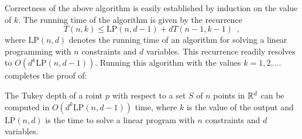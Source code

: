 \documentclass[charterfonts,lotsofwhite]{patmorin}
\newcommand{\lp}{\mathrm{LP}}
\begin{document}
Correctness of the above algorithm is easily established by induction
on the value of $k$.  The running time of the algorithm is given by
the recurrence
\[
    T(n,k) \le \lp(n,d-1)+ dT(n-1,k-1) \enspace ,
\]
where $\lp(n,d)$ denotes the running time of an algorithm for solving
a linear programming with $n$ constraints and $d$ variables.  This
recurrence readily resolves to $O(d^k\lp(n,d-1))$.  Running this
algorithm with the values $k=1,2,\ldots$ completes the
proof of:

\begin{thm}
The Tukey depth of a roint $p$ with respect to a set $S$ of $n$ points
in $\mathbb{R}^d$ can be computed in $O(d^k\lp(n,d-1))$ time, where $k$ is
the value of the output and $\lp(n,d)$ is the time to solve a linear
program with $n$ constraints and $d$ variables.
\end{thm}
\end{document}
